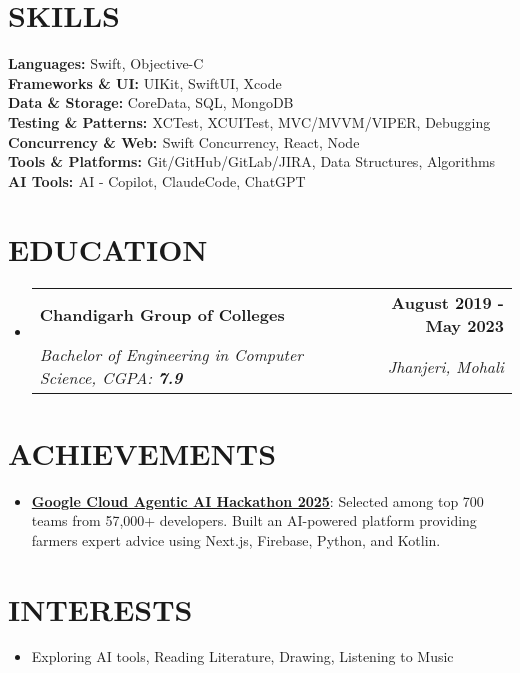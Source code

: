 \documentclass[letterpaper,11pt]{article}
\makeatletter
\newcommand{\resumeItem}[1]{
  \item\small{
    {#1 \vspace{-2pt}}
  }
}
\newcommand{\resumeSubheading}[4]{
  \vspace{-2pt}\item
    \begin{tabular*}{1.0\textwidth}[t]{l@{\extracolsep{\fill}}r}
      \textbf{\large#1} & \textbf{\small #2} \\
      \textit{\large#3} & \textit{\small #4} \\
      
    \end{tabular*}\vspace{-7pt}
}
\newcommand{\resumeSubHeadingListStart}{\begin{itemize}[leftmargin=0.0in, label={}]}
\newcommand{\resumeSubHeadingListEnd}{\end{itemize}}
\newcommand{\resumeItemListStart}{\begin{itemize}}
\newcommand{\resumeItemListEnd}{\end{itemize}\vspace{-5pt}}
\makeatother
\begin{document}
\section{SKILLS}
 \begin{itemize}[leftmargin=0.15in, label={}]
    \small{\item{
     \textbf{\normalsize{Languages:}}{ 
     \normalsize{Swift, Objective-C}} \\
     \textbf{\normalsize{Frameworks \& UI:}}{ 
     \normalsize{UIKit, SwiftUI, Xcode}} \\
     \textbf{\normalsize{Data \& Storage:}}{ \normalsize{CoreData, SQL, MongoDB}} \\
     \textbf{\normalsize{Testing \& Patterns: }}{ \normalsize{XCTest, XCUITest, MVC/MVVM/VIPER, Debugging}} \\
     \textbf{\normalsize{Concurrency \& Web: }}{\normalsize{Swift Concurrency, React, Node}} \\
     \textbf{\normalsize{Tools \& Platforms: }}{\normalsize{Git/GitHub/GitLab/JIRA, Data Structures, Algorithms}} \\
     \textbf{\normalsize{AI Tools: }}{\normalsize{AI - Copilot, ClaudeCode, ChatGPT}} \\
    }}
 \end{itemize}

\section{EDUCATION}
  \resumeSubHeadingListStart
    \resumeSubheading
      {Chandigarh Group of Colleges}{August 2019 - May 2023}
      {Bachelor of Engineering in Computer Science, CGPA: \textbf{7.9}}{Jhanjeri, Mohali}
  \resumeSubHeadingListEnd

\section{ACHIEVEMENTS}
    \vspace{0pt}
    \resumeItemListStart
        \resumeItem{\normalsize{\href{https://github.com/abhikumar002/Agentic-Gig-Project}{\textbf{Google Cloud Agentic AI Hackathon 2025}}: Selected among top 700 teams from 57,000+ developers. Built an AI-powered platform providing farmers expert advice using Next.js, Firebase, Python, and Kotlin.}}
    \resumeItemListEnd

\section{INTERESTS}
    \vspace{0pt}
    \resumeItemListStart
        \resumeItem{\normalsize{Exploring AI tools, Reading Literature, Drawing, Listening to Music}}
    \resumeItemListEnd
\end{document}
